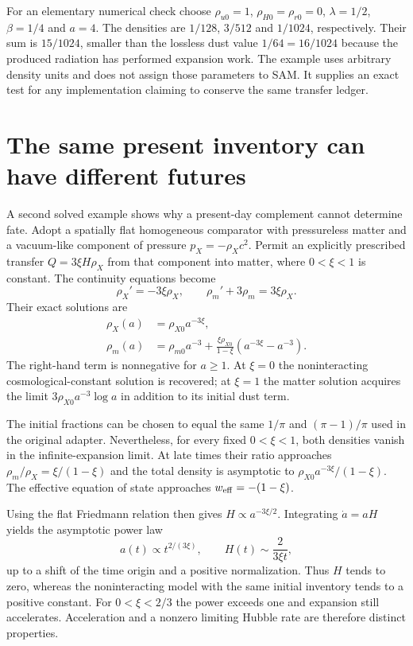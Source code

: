 For an elementary numerical check choose $\rho_{u0}=1$, $\rho_{H0}=\rho_{r0}=0$, $\lambda=1/2$, $\beta=1/4$ and $a=4$. The densities are $1/128$, $3/512$ and $1/1024$, respectively. Their sum is $15/1024$, smaller than the lossless dust value $1/64=16/1024$ because the produced radiation has performed expansion work. The example uses arbitrary density units and does not assign those parameters to SAM. It supplies an exact test for any implementation claiming to conserve the same transfer ledger.

\section{The same present inventory can have different futures}
A second solved example shows why a present-day complement cannot determine fate. Adopt a spatially flat homogeneous comparator with pressureless matter and a vacuum-like component of pressure $p_X=-\rho_Xc^2$. Permit an explicitly prescribed transfer $Q=3\xi H\rho_X$ from that component into matter, where $0<\xi<1$ is constant. The continuity equations become
\begin{equation}
 \rho_X'=-3\xi\rho_X,\qquad
 \rho_m'+3\rho_m=3\xi\rho_X.
 \label{c12:vacuumtransfer}
\end{equation}
Their exact solutions are
\begin{align}
 \rho_X(a)&=\rho_{X0}a^{-3\xi},\label{c12:vacuumsolution}\\
 \rho_m(a)&=\rho_{m0}a^{-3}
 +\frac{\xi\rho_{X0}}{1-\xi}(a^{-3\xi}-a^{-3}).
 \label{c12:mattersolution}
\end{align}
The right-hand term is nonnegative for $a\geq1$. At $\xi=0$ the noninteracting cosmological-constant solution is recovered; at $\xi=1$ the matter solution acquires the limit $3\rho_{X0}a^{-3}\log a$ in addition to its initial dust term.

The initial fractions can be chosen to equal the same $1/\pi$ and $(\pi-1)/\pi$ used in the original adapter. Nevertheless, for every fixed $0<\xi<1$, both densities vanish in the infinite-expansion limit. At late times their ratio approaches $\rho_m/\rho_X=\xi/(1-\xi)$ and the total density is asymptotic to $\rho_{X0}a^{-3\xi}/(1-\xi)$. The effective equation of state approaches $w_{\rm eff}=-(1-\xi)$.

Using the flat Friedmann relation then gives $H\propto a^{-3\xi/2}$. Integrating $\dot a=aH$ yields the asymptotic power law
\begin{equation}
 a(t)\propto t^{2/(3\xi)},\qquad H(t)\sim\frac{2}{3\xi t},
 \label{c12:powerfuture}
\end{equation}
up to a shift of the time origin and a positive normalization. Thus $H$ tends to zero, whereas the noninteracting model with the same initial inventory tends to a positive constant. For $0<\xi<2/3$ the power exceeds one and expansion still accelerates. Acceleration and a nonzero limiting Hubble rate are therefore distinct properties.

